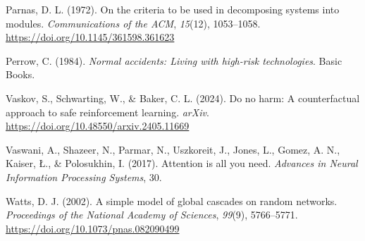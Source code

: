 \documentclass[11pt]{article}
\begin{document}
\begin{description}[leftmargin=1.5em, labelindent=0em, itemsep=0.4em]
\item Parnas, D. L. (1972). On the criteria to be used in decomposing systems into modules. \emph{Communications of the ACM}, \emph{15}(12), 1053--1058. \url{https://doi.org/10.1145/361598.361623}

\item Perrow, C. (1984). \emph{Normal accidents: Living with high-risk technologies}. Basic Books.

\item Vaskov, S., Schwarting, W., \& Baker, C. L. (2024). Do no harm: A counterfactual approach to safe reinforcement learning. \emph{arXiv}. \url{https://doi.org/10.48550/arxiv.2405.11669}

\item Vaswani, A., Shazeer, N., Parmar, N., Uszkoreit, J., Jones, L., Gomez, A. N., Kaiser, \L., \& Polosukhin, I. (2017). Attention is all you need. \emph{Advances in Neural Information Processing Systems}, 30.

\item Watts, D. J. (2002). A simple model of global cascades on random networks. \emph{Proceedings of the National Academy of Sciences}, \emph{99}(9), 5766--5771. \url{https://doi.org/10.1073/pnas.082090499}
\end{description}
\end{document}
